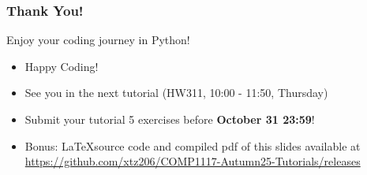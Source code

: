 \documentclass{beamer}
\begin{document}
\begin{frame}
    \frametitle{Thank You!}

    Enjoy your coding journey in Python!

    \begin{itemize}
        \item Happy Coding!
        \item See you in the next tutorial (HW311, 10:00 - 11:50, Thursday)
        \item Submit your tutorial 5 exercises before \textbf{October 31 23:59}!

        \item Bonus: \LaTeX source code and compiled pdf of this slides available at
              \href{https://github.com/xtz206/COMP1117-Autumn25-Tutorials/releases}
              {https://github.com/xtz206/COMP1117-Autumn25-Tutorials/releases}
    \end{itemize}
\end{frame}
\end{document}
